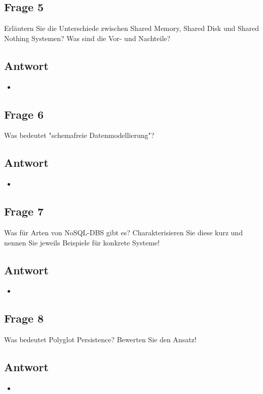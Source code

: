 \subsection*{Frage 5}
Erläutern Sie die Unterschiede zwischen Shared Memory, Shared Disk und Shared Nothing Systemen? Was sind die Vor- und Nachteile?
\subsection*{Antwort}
\begin{itemize}
	\item 
\end{itemize}

\subsection*{Frage 6}
Was bedeutet "schemafreie Datenmodellierung"?
\subsection*{Antwort}
\begin{itemize}
	\item 
\end{itemize}

\subsection*{Frage 7}
Was für Arten von NoSQL-DBS gibt es? Charakterisieren Sie diese kurz und nennen Sie jeweils Beispiele für konkrete Systeme!
\subsection*{Antwort}
\begin{itemize}
	\item 
\end{itemize}

\subsection*{Frage 8}
Was bedeutet Polyglot Persistence? Bewerten Sie den Ansatz!
\subsection*{Antwort}
\begin{itemize}
	\item 
\end{itemize}

